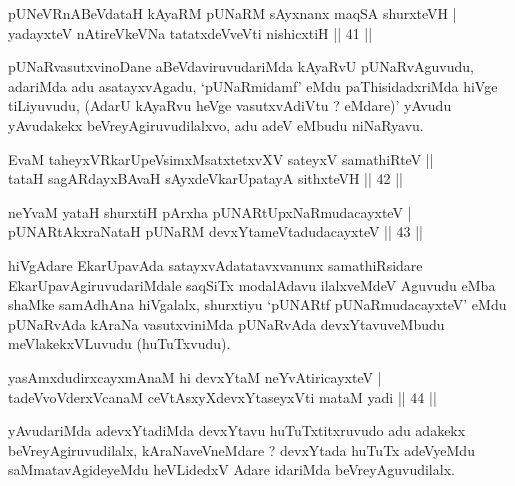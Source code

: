 
\begin{shl}
pUNeVRnABeVdataH kAyaRM pUNaRM sAyxnanx maqSA shurxteVH  | \\
yadayxteV nAtireVkeVNa tatatxdeVveVti nishicxtiH \hfill||  41 ||  
\end{shl}

\begin{artha}
pUNaRvasutxvinoDane aBeVdaviruvudariMda kAyaRvU pUNaRvAguvudu, adariMda adu asatayxvAgadu, `pUNaRmidamf' eMdu paThisidadxriMda hiVge tiLiyuvudu, (AdarU kAyaRvu heVge vasutxvAdiVtu ? eMdare)' yAvudu yAvudakekx beVreyAgiruvudilalxvo, adu adeV eMbudu niNaRyavu.
\end{artha}


\begin{shl}
EvaM taheyxVRkarUpeV\s simxMsatxtetxvXV sateyxV samathiRteV ||  \\
tataH sagARdayxBAvaH sAyxdeVkarUpatayA sithxteVH \hfill||  42 ||  
\end{shl}

\begin{shl}
neYvaM yataH shurxtiH pArxha pUNARtUpxNaRmudacayxteV  | \\
pUNARtAkxraNataH pUNaRM devxYtameVtadudacayxteV \hfill||  43 ||  
\end{shl}

\begin{artha}
hiVgAdare EkarUpavAda satayxvAdatatavxvanunx samathiRsidare EkarUpavAgiruvudariMdale saqSiTx modalAdavu ilalxveMdeV Aguvudu \mdash  eMba shaMke \mdash  samAdhAna \mdash  hiVgalalx, shurxtiyu `pUNARtf pUNaRmudacayxteV' eMdu pUNaRvAda kAraNa vasutxviniMda pUNaRvAda devxYtavuveMbudu meVlakekxVLuvudu (huTuTxvudu).
\end{artha}



\begin{shl}
yasAmxdudirxcayxmAnaM hi devxYtaM neYvAtiricayxteV  | \\
tadeVvoVderxVcanaM ceVtAsxyXdevxYtaseyxVti mataM yadi \hfill||  44 ||  
\end{shl}

\begin{artha}
yAvudariMda adevxYtadiMda devxYtavu huTuTxtitxruvudo adu adakekx beVreyAgiruvudilalx, kAraNaveVneMdare ? devxYtada huTuTx adeVyeMdu saMmatavAgideyeMdu heVLidedxV Adare idariMda beVreyAguvudilalx.
\end{artha}

